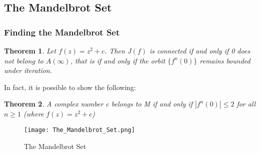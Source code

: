 \documentclass{article}
\newtheorem{theorem}{Theorem}[section]
\begin{document}
\subsection{The Mandelbrot Set}

\subsubsection{Finding the Mandelbrot Set}
\begin{theorem}
Let $f(z) = z^2 + c$. Then $J(f)$ is connected if and only if 0 does not belong to $A(\infty)$, that is if and only if the orbit $\{f^n(0)\}$ remains bounded under iteration.
\end{theorem}
In fact, it is possible to show the following:
\begin{theorem}
A complex number c belongs to M if and only if $\left|f^n(0)\right| \leq 2$ for all $n \geq 1$ (where $f(z) = z^2 + c$)
\end{theorem}
\begin{figure}[h]
\centering
\texttt{[image: The\_Mandelbrot\_Set.png]}
\caption{The Mandelbrot Set}
\end{figure}
\end{document}
